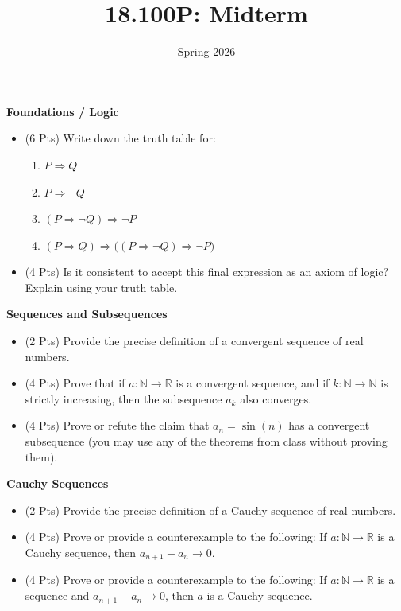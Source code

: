 \documentclass{article}
\title{18.100P: Midterm}
\date{Spring 2026}
\begin{document}
    \maketitle
    \textbf{Foundations / Logic}
    \begin{itemize}
        \item (6 Pts)
            Write down the truth table for:
            \begin{enumerate}
                \item
                    $P\Rightarrow{Q}$
                \item
                    $P\Rightarrow\neg{Q}$
                \item
                    $(P\Rightarrow\neg{Q})\Rightarrow\neg{P}$
                \item
                    $(P\Rightarrow{Q})\Rightarrow\big((P\Rightarrow\neg{Q})\Rightarrow\neg{P}\big)$
            \end{enumerate}
        \item (4 Pts)
            Is it consistent to accept this final expression
            as an axiom of logic? Explain using your truth table.
    \end{itemize}
    \newpage
    \textbf{Sequences and Subsequences}
    \begin{itemize}
        \item (2 Pts)
            Provide the precise definition of a convergent sequence of real
            numbers.
        \item (4 Pts)
            Prove that if $a:\mathbb{N}\rightarrow\mathbb{R}$ is a
            convergent sequence, and if $k:\mathbb{N}\rightarrow\mathbb{N}$
            is strictly increasing, then the subsequence $a_{k}$ also
            converges.
        \item (4 Pts)
            Prove or refute the claim that
            $a_{n}=\sin(n)$ has a convergent subsequence
            (you may use any of the theorems from class without proving them).
    \end{itemize}
    \newpage
    \textbf{Cauchy Sequences}
    \begin{itemize}
        \item (2 Pts)
            Provide the precise definition of a Cauchy sequence of real numbers.
        \item
            (4 Pts)
            Prove or provide a counterexample to the following:
            If $a:\mathbb{N}\rightarrow\mathbb{R}$ is a Cauchy sequence, then
            $a_{n+1}-a_{n}\rightarrow{0}$.
        \item
            (4 Pts)
            Prove or provide a counterexample to the following:
            If $a:\mathbb{N}\rightarrow\mathbb{R}$ is a sequence and
            $a_{n+1}-a_{n}\rightarrow{0}$, then $a$ is a Cauchy sequence.
    \end{itemize}
\end{document}
